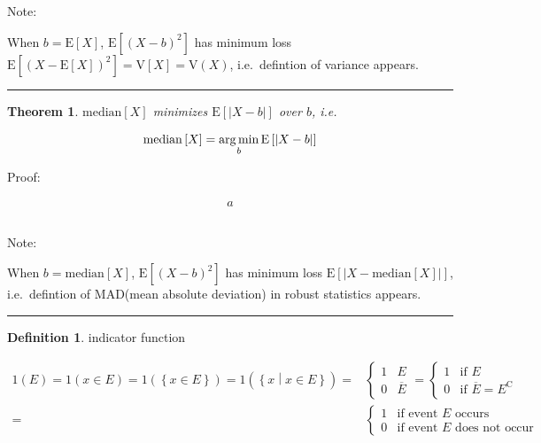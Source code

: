 \documentclass[
]{book}
\newtheorem{theorem}{Theorem}[chapter]
\theoremstyle{definition}
\newtheorem{definition}{Definition}[chapter]
\theoremstyle{definition}
\theoremstyle{definition}
\theoremstyle{definition}
\theoremstyle{remark}
\begin{document}
\[
\tag*{$\Box$}
\]

Note:

When \(b=\mathrm{E}\left[X\right]\), \(\mathrm{E}\left[\left(X-b\right)^{2}\right]\) has minimum loss \(\mathrm{E}\left[\left(X-\mathrm{E}\left[X\right]\right)^{2}\right]=\mathrm{V}\left[X\right]=\mathrm{V}\left(X\right)\), i.e.~defintion of variance appears.

\begin{center}\rule{0.5\linewidth}{0.5pt}\end{center}

\begin{theorem}
\protect\hypertarget{thm:unnamed-chunk-21}{}\label{thm:unnamed-chunk-21}\(\mathrm{median}\left[X\right]\) minimizes \(\mathrm{E}\left[\left|X-b\right|\right]\) over \(b\), i.e.
\end{theorem}

\[
\mathrm{median}\left[X\right]=\underset{b}{\arg\min}\thinspace\mathrm{E}\left[\left|X-b\right|\right]
\]

Proof:

\[
\begin{aligned}
a
\end{aligned}
\]

\[
\tag*{$\Box$}
\]

Note:

When \(b=\mathrm{median}\left[X\right]\), \(\mathrm{E}\left[\left(X-b\right)^{2}\right]\) has minimum loss \(\mathrm{E}\left[\left|X-\mathrm{median}\left[X\right]\right|\right]\), i.e.~defintion of MAD(mean absolute deviation) in robust statistics appears.

\begin{center}\rule{0.5\linewidth}{0.5pt}\end{center}

\begin{definition}
\protect\hypertarget{def:unnamed-chunk-22}{}\label{def:unnamed-chunk-22}indicator function
\end{definition}

\[
\begin{aligned}
1\left(E\right)=1\left(x\in E\right)=1\left(\left\{ x\in E\right\} \right)=1\left(\left\{ x\middle|x\in E\right\} \right)= & \begin{cases}
1 & E\\
0 & \overline{E}
\end{cases}=\begin{cases}
1 & \text{if }E\\
0 & \text{if }\overline{E}=E^{\mathrm{C}}
\end{cases}\\
= & \begin{cases}
1 & \text{if event }E\text{ occurs}\\
0 & \text{if event }E\text{ does not occur}
\end{cases}
\end{aligned}
\]
\end{document}
